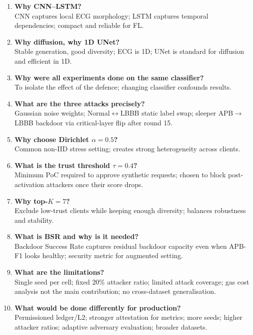 \documentclass[11pt,a4paper]{article}
\begin{document}
\begin{enumerate}
\item \textbf{Why CNN--LSTM?}\\
CNN captures local ECG morphology; LSTM captures temporal dependencies; compact and reliable for FL.

\item \textbf{Why diffusion, why 1D UNet?}\\
Stable generation, good diversity; ECG is 1D; UNet is standard for diffusion and efficient in 1D.

\item \textbf{Why were all experiments done on the same classifier?}\\
To isolate the effect of the defence; changing classifier confounds results.

\item \textbf{What are the three attacks precisely?}\\
Gaussian noise weights; Normal$\leftrightarrow$LBBB static label swap; sleeper APB$\rightarrow$LBBB backdoor via critical-layer flip after round 15.

\item \textbf{Why choose Dirichlet $\alpha=0.5$?}\\
Common non-IID stress setting; creates strong heterogeneity across clients.

\item \textbf{What is the trust threshold $\tau=0.4$?}\\
Minimum PoC required to approve synthetic requests; chosen to block post-activation attackers once their score drops.

\item \textbf{Why top-$K=7$?}\\
Exclude low-trust clients while keeping enough diversity; balances robustness and stability.

\item \textbf{What is BSR and why is it needed?}\\
Backdoor Success Rate captures residual backdoor capacity even when APB-F1 looks healthy; security metric for augmented setting.

\item \textbf{What are the limitations?}\\
Single seed per cell; fixed 20\% attacker ratio; limited attack coverage; gas cost analysis not the main contribution; no cross-dataset generalisation.

\item \textbf{What would be done differently for production?}\\
Permissioned ledger/L2; stronger attestation for metrics; more seeds; higher attacker ratios; adaptive adversary evaluation; broader datasets.


\end{enumerate}
\end{document}
